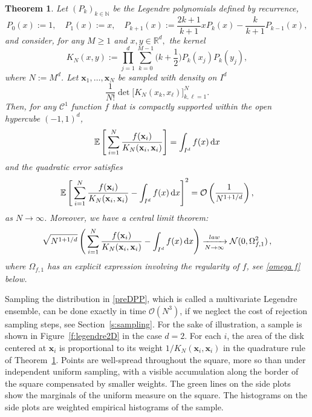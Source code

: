 \documentclass[a4paper,11pt]{article}
\numberwithin{equation}{section}
\newtheorem{theorem}{Theorem}[]
\theoremstyle{definition}
\newcommand{\rev}[1]{#1}
\newcommand{\eq}{\begin{equation}}
\newcommand{\qe}{\end{equation}}
\newcommand{\N}{\mathbb{N}}
\newcommand{\R}{\mathbb{R}}
\newcommand{\E}{\mathbb{E}}
\newcommand{\cO}{\mathcal{O}}
\newcommand{\bv}{\mathbf}
\renewcommand{\geq}{\geqslant}
\renewcommand{\d}{ {\rm d}}
\def\bx{{\bv x}}
\begin{document}
\rev{
\begin{theorem}
  \label{t:legendre} Let $(P_k)_{k\in\N}$ be the Legendre polynomials defined by recurrence,
$$
P_0(x):=1,\quad P_1(x):=x,\quad P_{k+1}(x):=\frac{2k+1}{k+1} xP_k(x)-\frac k{k+1}P_{k-1}(x),
$$
and consider, for any $M\geq 1$ and  $x,y\in\R^d,$  the kernel
$$
K_N(x,y):=\prod_{j=1}^d\sum_{k=0}^{M-1}\big(k+\frac12\big)P_k(x_j)P_k(y_j),
$$
where $N:=M^d$. Let $\bv x_1,\ldots,\bv x_N$ be sampled with density on $I^d$
\eq
\label{preDPP}
\frac1{N!}\det\Big[K_N(x_k,x_\ell)\Big]_{k,\ell=1}^N.
\qe
Then, for any $\mathscr C^1$ function $f$ that is compactly supported within the open hypercube $(-1,1)^d$,
$$
\E\left[\,\sum_{i=1}^N  \frac{f(\bv x_i)}{K_N(\bv x_i,\bv x_i)}\right]=\int_{I^d} f(x) \,\d x
$$
and the quadratic error satisfies
$$
\E\left[\,\sum_{i=1}^N  \frac{f(\bv x_i)}{K_N(\bv x_i,\bv x_i)}-\int_{I^d} f(x) \,\d x\right]^2=\cO\left( \frac1{N^{1+1/d}}\right),
$$
as $N\to\infty$. Moreover, we have a central limit theorem:
$$
\sqrt{N^{1+1/d}}\left(\,\sum_{i=1}^N  \frac{f(\bv x_i)}{K_N(\bv x_i,\bv x_i)}-\int_{I^d} f(x) \,\d x\right)\xrightarrow[N\to\infty]{law} \mathcal N(0,\Omega_{f,1}^2)\, ,
$$
where $\Omega_{f,1}$ has an explicit expression involving the regularity of $f$, see \eqref{omega f} below.
\end{theorem}
}
\rev{
Sampling the distribution in \eqref{preDPP}, which is called a multivariate Legendre ensemble, can be done exactly in time $\cO(N^3)$, if we neglect the cost of rejection sampling steps, see Section~\ref{s:sampling}. For the sake of illustration, a sample is shown in Figure~\ref{f:legendre2D} in the case $d=2$. For each $i$, the area of the disk centered at $\bx_i$ is proportional to its weight $1/K_N(\bx_i,\bx_i)$ in the quadrature rule of Theorem~\ref{t:legendre}. Points are well-spread throughout the square, more so than under independent uniform sampling, with a visible accumulation along the border of the square compensated by smaller weights. The green lines on the side plots show the marginals of the uniform measure on the square. The histograms on the side plots are weighted empirical histograms of the sample.
}
\end{document}
